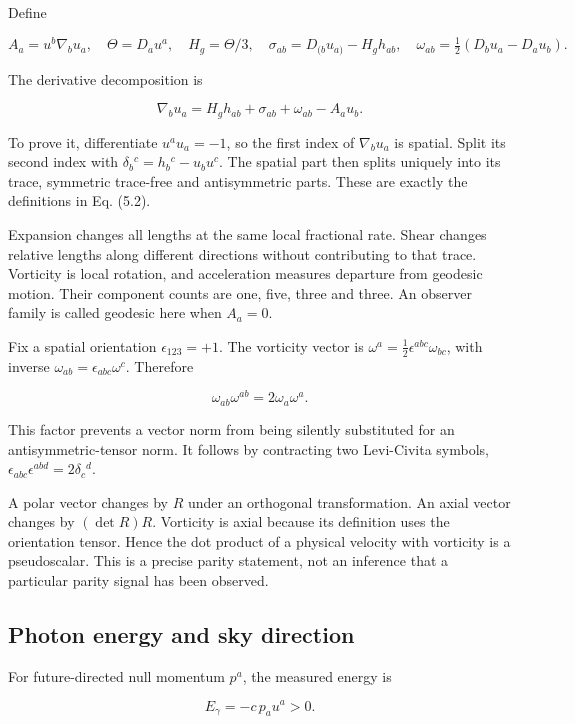 \documentclass[
  11pt,
  a4paper]{article}
\begin{document}
Define

\[
A_a=u^b\nabla_bu_a,\quad
\Theta=D_au^a,\quad H_g=\Theta/3,\quad
\sigma_{ab}=D_{(b}u_{a)}-H_gh_{ab},\quad
\omega_{ab}=\tfrac12(D_bu_a-D_au_b).
\tag{5.2}
\]

The derivative decomposition is

\[
\nabla_bu_a=H_gh_{ab}+\sigma_{ab}+\omega_{ab}-A_au_b.
\tag{5.3}
\]

To prove it, differentiate \(u^au_a=-1\), so the first index of \(\nabla_bu_a\) is spatial. Split its second index with \(\delta_b{}^c=h_b{}^c-u_bu^c\). The spatial part then splits uniquely into its trace, symmetric trace-free and antisymmetric parts. These are exactly the definitions in Eq. (5.2).

Expansion changes all lengths at the same local fractional rate. Shear changes relative lengths along different directions without contributing to that trace. Vorticity is local rotation, and acceleration measures departure from geodesic motion. Their component counts are one, five, three and three. An observer family is called geodesic here when \(A_a=0\).

Fix a spatial orientation \(\epsilon_{123}=+1\). The vorticity vector is
\(\omega^a=\tfrac12\epsilon^{abc}\omega_{bc}\), with inverse
\(\omega_{ab}=\epsilon_{abc}\omega^c\). Therefore

\[
\omega_{ab}\omega^{ab}=2\omega_a\omega^a.
\tag{5.4}
\]

This factor prevents a vector norm from being silently substituted for an antisymmetric-tensor norm. It follows by contracting two Levi-Civita symbols, \(\epsilon_{abc}\epsilon^{abd}=2\delta_c{}^d\).

A polar vector changes by \(R\) under an orthogonal transformation. An axial vector changes by \((\det R)R\). Vorticity is axial because its definition uses the orientation tensor. Hence the dot product of a physical velocity with vorticity is a pseudoscalar. This is a precise parity statement, not an inference that a particular parity signal has been observed.

\hypertarget{photon-energy-and-sky-direction}{%
\subsection{Photon energy and sky direction}\label{photon-energy-and-sky-direction}}

For future-directed null momentum \(p^a\), the measured energy is

\[
E_\gamma=-c\,p_au^a>0.
\tag{5.5}
\]
\end{document}
